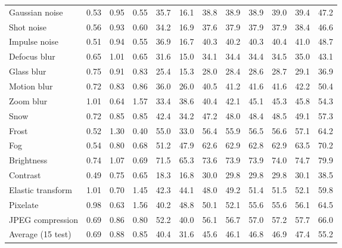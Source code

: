 \begin{table}[t]
\begin{tabular}{l|ccc|cc|cc|cccc}
        \midrule
        Gaussian noise & 0.53 & 0.95 & 0.55 & 35.7 & 16.1 & 38.8 & 38.9 & 38.9 & 39.0 & 39.4 & 47.2 \\
        Shot noise & 0.56 & 0.93 & 0.60 & 34.2 & 16.9 & 37.6 & 37.9 & 37.9 & 37.9 & 38.4 & 46.6 \\
        Impulse noise & 0.51 & 0.94 & 0.55 & 36.9 & 16.7 & 40.3 & 40.2 & 40.3 & 40.4 & 41.0 & 48.7 \\
        Defocus blur & 0.65 & 1.01 & 0.65 & 31.6 & 15.0 & 34.1 & 34.4 & 34.4 & 34.5 & 35.0 & 43.1 \\
        Glass blur & 0.75 & 0.91 & 0.83 & 25.4 & 15.3 & 28.0 & 28.4 & 28.6 & 28.7 & 29.1 & 36.9 \\
        Motion blur & 0.72 & 0.83 & 0.86 & 36.0 & 26.0 & 40.5 & 41.2 & 41.6 & 41.6 & 42.2 & 50.4 \\
        Zoom blur & 1.01 & 0.64 & 1.57 & 33.4 & 38.6 & 40.4 & 42.1 & 45.1 & 45.3 & 45.8 & 54.3 \\
        Snow & 0.72 & 0.85 & 0.85 & 42.4 & 34.2 & 47.2 & 48.0 & 48.4 & 48.5 & 49.1 & 57.3 \\
        Frost & 0.52 & 1.30 & 0.40 & 55.0 & 33.0 & 56.4 & 55.9 & 56.5 & 56.6 & 57.1 & 64.2 \\
        Fog & 0.54 & 0.80 & 0.68 & 51.2 & 47.9 & 62.6 & 62.9 & 62.8 & 62.9 & 63.5 & 70.2 \\
        Brightness & 0.74 & 1.07 & 0.69 & 71.5 & 65.3 & 73.6 & 73.9 & 73.9 & 74.0 & 74.7 & 79.9 \\
        Contrast & 0.49 & 0.75 & 0.65 & 18.3 & 16.8 & 30.0 & 29.8 & 29.8 & 29.8 & 30.1 & 38.5 \\
        Elastic transform & 1.01 & 0.70 & 1.45 & 42.3 & 44.1 & 48.0 & 49.2 & 51.4 & 51.5 & 52.1 & 59.8 \\
        Pixelate & 0.98 & 0.63 & 1.56 & 40.2 & 48.8 & 50.1 & 52.1 & 55.6 & 55.6 & 56.1 & 64.5 \\
        JPEG compression & 0.69 & 0.86 & 0.80 & 52.2 & 40.0 & 56.1 & 56.7 & 57.0 & 57.2 & 57.7 & 66.0 \\
        \midrule
        Average (15 test) & 0.69 & 0.88 & 0.85 & 40.4 & 31.6 & 45.6 & 46.1 & 46.8 & 46.9 & 47.4 & 55.2 \\
        \bottomrule
    \end{tabular}
\end{table}
